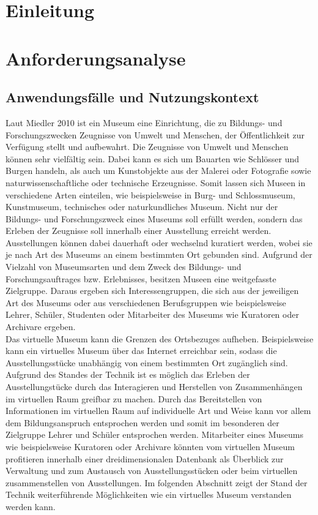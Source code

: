 \documentclass[runningheads,a4paper]{llncs}
\newcommand{\keywords}[1]{\par\addvspace\baselineskip
\noindent\keywordname\enspace\ignorespaces#1}
\begin{document}
\begin{abstract}
	

\keywords{}
\end{abstract}

\section{Einleitung}
\section{Anforderungsanalyse}
\subsection{Anwendungsfälle und Nutzungskontext}
Laut Miedler 2010 ist ein Museum eine Einrichtung, die zu Bildungs- und Forschungszwecken Zeugnisse von Umwelt und Menschen, der Öffentlichkeit zur Verfügung stellt und aufbewahrt. Die Zeugnisse von Umwelt und Menschen können sehr vielfältig sein. Dabei kann es sich um Bauarten wie Schlösser und Burgen handeln, als auch um Kunstobjekte aus der Malerei oder Fotografie sowie naturwissenschaftliche oder technische Erzeugnisse. Somit lassen sich Museen in verschiedene Arten einteilen, wie beispielsweise in Burg- und Schlossmuseum, Kunstmuseum, technisches oder naturkundliches Museum. Nicht nur der Bildungs- und Forschungszweck eines Museums soll erfüllt werden, sondern das Erleben der Zeugnisse soll innerhalb einer Ausstellung erreicht werden. Ausstellungen können dabei dauerhaft oder wechselnd kuratiert werden, wobei sie je nach Art des Museums an einem bestimmten Ort gebunden sind. Aufgrund der Vielzahl von Museumsarten und dem Zweck des Bildungs- und Forschungsauftrages bzw. Erlebnisses, besitzen Museen eine weitgefasste Zielgruppe. Daraus ergeben sich Interessengruppen, die sich aus der jeweiligen Art des Museums oder aus verschiedenen Berufsgruppen wie beispielsweise Lehrer, Schüler, Studenten oder Mitarbeiter des Museums wie Kuratoren oder Archivare  ergeben\cite[S. 29]{Miedler.2010}.\\ 

Das virtuelle Museum kann die Grenzen des Ortsbezuges aufheben. Beispielsweise kann ein virtuelles Museum über das Internet erreichbar sein, sodass die Ausstellungsstücke unabhängig von einem bestimmten Ort zugänglich sind. Aufgrund des Standes der Technik ist es möglich das Erleben der Ausstellungstücke durch das Interagieren und Herstellen von Zusammenhängen im virtuellen Raum greifbar zu machen. Durch das Bereitstellen von Informationen im virtuellen Raum auf individuelle Art und Weise kann vor allem dem Bildungsanspruch entsprochen werden und somit im besonderen der Zielgruppe Lehrer und Schüler entsprochen werden. Mitarbeiter eines Museums wie beispielsweise Kuratoren oder Archivare könnten vom virtuellen Museum profitieren innerhalb einer dreidimensionalen Datenbank als Überblick zur Verwaltung und zum Austausch von Ausstellungsstücken oder beim virtuellen zusammenstellen von Ausstellungen. Im folgenden Abschnitt zeigt der Stand der Technik weiterführende Möglichkeiten wie ein virtuelles Museum verstanden werden kann.\\
\end{document}
